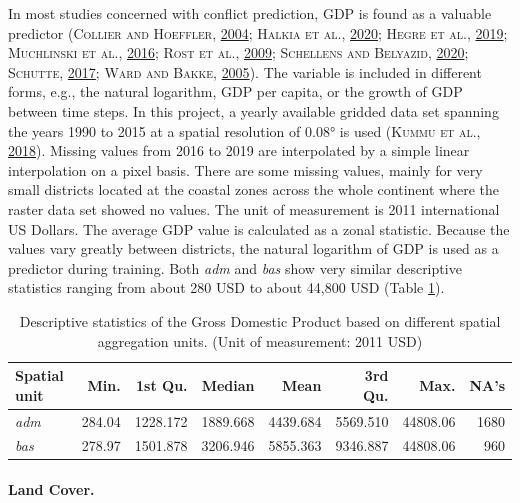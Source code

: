 \documentclass[a4paper,11pt]{article}
\begin{document}
In most studies concerned with conflict prediction, GDP is found as a valuable predictor
\textsc{(\textnormal{\textsc{Collier} and \textsc{Hoeffler}}, \textnormal{\protect\hyperlink{ref-collier2004}{2004}}; \textnormal{\textsc{Halkia} \textsc{et al.}}, \textnormal{\protect\hyperlink{ref-halkia2020a}{2020}}; \textnormal{\textsc{Hegre} \textsc{et al.}}, \textnormal{\protect\hyperlink{ref-hegre2019}{2019}}; \textnormal{\textsc{Muchlinski} \textsc{et al.}}, \textnormal{\protect\hyperlink{ref-muchlinski2016}{2016}}; \textnormal{\textsc{Rost} \textsc{et al.}}, \textnormal{\protect\hyperlink{ref-rost2009}{2009}}; \textnormal{\textsc{Schellens} and \textsc{Belyazid}}, \textnormal{\protect\hyperlink{ref-schellens2020}{2020}}; \textnormal{\textsc{Schutte}}, \textnormal{\protect\hyperlink{ref-schutte2017}{2017}}; \textnormal{\textsc{Ward} and \textsc{Bakke}}, \textnormal{\protect\hyperlink{ref-ward2005a}{2005}})}.
The variable is included in different forms, e.g., the natural logarithm, GDP
per capita, or the growth of GDP between time steps. In this project, a
yearly available gridded data set spanning the years 1990 to 2015 at a spatial
resolution of 0.08° is used \textsc{(\textnormal{\textsc{Kummu} \textsc{et al.}}, \textnormal{\protect\hyperlink{ref-kummu2018}{2018}})}. Missing values from 2016 to 2019 are
interpolated by a simple linear interpolation on a pixel basis. There are some
missing values, mainly for very small districts located at the coastal zones
across the whole continent where the raster data set showed no values. The unit
of measurement is 2011 international US Dollars. The average GDP value is calculated
as a zonal statistic. Because the values vary greatly between districts, the
natural logarithm of GDP is used as a predictor during training.
Both \emph{adm} and \emph{bas} show very similar descriptive statistics ranging from
about 280 USD to about 44,800 USD (Table \ref{tab:02-data-gdp}).
\begin{table}[H]

\caption[Descriptive statistics of the Gross Domestic Product (GDP).]{\label{tab:02-data-gdp}Descriptive statistics of the Gross Domestic Product based on different spatial
               aggregation units. (Unit of measurement: 2011 USD)}
\centering
\fontsize{10}{12}\selectfont
\begin{tabular}[t]{lrrrrrrr}
\toprule
Spatial unit & Min. & 1st Qu. & Median & Mean & 3rd Qu. & Max. & NA's\\
\midrule
\textit{adm} & 284.04 & 1228.172 & 1889.668 & 4439.684 & 5569.510 & 44808.06 & 1680\\
\textit{bas} & 278.97 & 1501.878 & 3206.946 & 5855.363 & 9346.887 & 44808.06 & 960\\
\bottomrule
\end{tabular}
\end{table}
\hypertarget{land-cover.}{%
\paragraph{Land Cover.}\label{land-cover.}}
\end{document}
